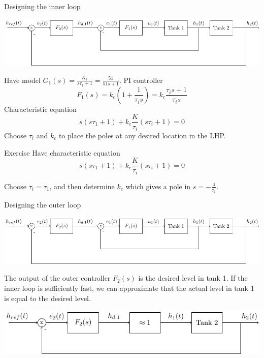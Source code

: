 \documentclass[presentation,aspectratio=169, usenames, dvipsnames]{beamer}
\begin{document}
\begin{frame}[label={sec:orga6e9544}]{Designing the inner loop}
\begin{center}
\includegraphics[width=0.6\linewidth]{../../figures/block-diagram-cascade-control.pdf}
\end{center}
Have model \(G_1(s) = \frac{K_1}{s\tau_1 + 1} = \frac{51}{51s + 1}\). PI controller \[F_1(s) = k_{c} \left( 1 + \frac{1}{\tau_{i}s}\right) = k_{c} \frac{\tau_{i}s + 1}{\tau_{i}s}\]
Characteristic equation
\[ s(s\tau_1 + 1) + k_c \frac{K}{\tau_{i}}(s\tau_{i} + 1) = 0\]
Choose \(\tau_i\) and \(k_c\) to place the poles at any desired location in the LHP. 
\end{frame}

\begin{frame}[label={sec:org4059860}]{Exercise}
Have characteristic equation
\[ s(s\tau_1 + 1) + k_c \frac{K}{\tau_{i}}(s\tau_{i} + 1) = 0\]

\alert{Choose \(\tau_i = \tau_1\), and then determine \(k_c\) which gives a pole in \(s=-\frac{4}{\tau_1}\).}
\end{frame}

\begin{frame}[label={sec:org12b38e8}]{Designing the outer loop}
\begin{center}
\includegraphics[width=0.6\linewidth]{../../figures/block-diagram-cascade-control.pdf}
\end{center}
The output of the outer controller \(F_2(s)\) is the desired level in tank 1. If the inner loop is sufficiently fast, we can approximate that the actual level in tank 1 is equal to the desired level. 

\begin{center}
\includegraphics[width=0.9\linewidth]{../../figures/block-diagram-cascade-outer-loop}
\end{center}
\end{frame}
\end{document}
